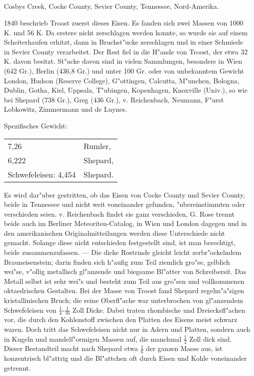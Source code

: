 \documentclass[a4paper, 11pt, oneside]{article}
\begin{document}
\subsection{}
\LARGE
\paragraph{}
Cosbys Creek, Cocke County, Sevier County, Tennessee, Nord-Amerika.

1840 beschrieb Troost zuerst dieses Eisen. Es fanden sich zwei Massen von 1000 K. und 56 K. Da erstere nicht zerschlagen werden konnte, so wurde sie auf einem Scheiterhaufen erhitzt, dann in Bruchst"ucke zerschlagen und in einer Schmiede in Sevier County verarbeitet. Der Rest fiel in die H"ande von Troost, der etwa 32 K. davon besitzt. St"ucke davon sind in vielen Sammlungen, besonders in Wien (642 Gr.), Berlin (436,8 Gr.) und unter 100 Gr. oder von unbekanntem Gewicht London, Hudson (Reserve College), G"ottingen, Calcutta, M"unchen, Bologna, Dublin, Gotha, Kiel, Uppsala, T"ubingen, Kopenhagen, Knoxville (Univ.), so wie bei Shepard (738 Gr.), Greg (436 Gr.), v. Reichenbach, Neumann, F"urst Lobkowitz, Zimmermann und de Luynes.

Spezifisches Gewicht:  
\begin{table}[!ht]
    \centering\swabfamily\Large
    \begin{tabular}{l l}
        7,26 & Rumler,\\
        6,222 & Shepard,\\
        Schwefeleisen: 4,454 & Shepard.
    \end{tabular}
\end{table}

Es wird dar"uber gestritten, ob das Eisen von Cocke County und Sevier County, beide in Tennessee und nicht weit voneinander gefunden, "ubereinstimmten oder verschieden seien. v. Reichenbach findet sie ganz verschieden, G. Rose trennt beide auch im Berliner Meteoriten-Catalog, in Wien und London dagegen und in den amerikanischen Originalmitteilungen werden diese Unterschiede nicht gemacht. Solange diese nicht entschieden festgestellt sind, ist man berechtigt, beide zusammenzufassen. --- Die dicke Rostrinde gleicht leicht zerbr"ockelndem Brauneisenstein; darin finden sich h"aufig zum Teil ziemlich gro"se, gelblich wei"se, v"ollig metallisch gl"anzende und biegsame Bl"atter von Schreibersit. Das Metall selbst ist sehr wei"s und besteht zum Teil aus gro"sen und vollkommenen oktaedrischen Gestalten. Bei der Masse von Troost fand Shepard regelm"a"sigen kristallinischen Bruch; die reine Oberfl"ache war unterbrochen von gl"anzendem Schwefeleisen von $\mathfrak{\frac{1}{4}}$-$\mathfrak{\frac{1}{16}}$ Zoll Dicke. Dabei traten rhombische und Dreiecksfl"achen vor, die durch den Kohlenstoff zwischen den Platten des Eisens meist schwarz waren. Doch tritt das Schwefeleisen nicht nur in Adern und Platten, sondern auch in Kugeln und mandelf"ormigen Massen auf, die manchmal $\mathfrak{\frac{1}{2}}$ Zoll dick sind. Dieser Bestandteil macht nach Shepard etwa $\mathfrak{\frac{1}{6}}$ der ganzen Masse aus, ist konzentrisch bl"attrig und die Bl"attchen oft durch Eisen und Kohle voneinander getrennt.
\end{document}

